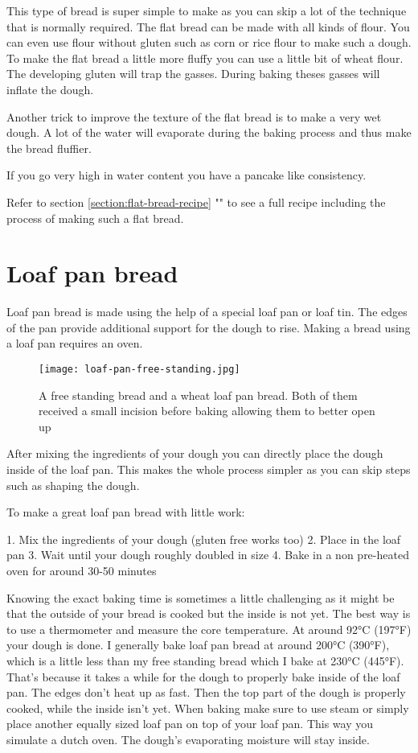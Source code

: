 This type of bread is super simple to make as you can skip
a lot of the technique that is normally required. The flat
bread can be made with all kinds of flour. You can even use
flour without gluten such as corn or rice flour to make such
a dough. To make the flat bread a little more fluffy you
can use a little bit of wheat flour. The developing gluten
will trap the gasses. During baking theses gasses will
inflate the dough.

Another trick to improve the texture of the flat bread is to
make a very wet dough. A lot of the water will evaporate
during the baking process and thus make the bread fluffier.

If you go very high in water content you have a pancake
like consistency.

Refer to section \ref{section:flat-bread-recipe} ""
to see a full recipe including the process of making such a flat bread.

\section{Loaf pan bread}

Loaf pan bread is made using the help of a special loaf pan
or loaf tin. The edges of the pan provide additional support
for the dough to rise. Making a bread using a loaf pan requires
an oven.

\begin{figure}[!htb]
  \texttt{[image: loaf-pan-free-standing.jpg]}
  \caption{A free standing bread and a wheat loaf pan bread. Both of them
  received a small incision before baking allowing them to
  better open up}
  \label{fig:free-standing-loaf-pan}
\end{figure}

After mixing the ingredients of your dough you can directly
place the dough inside of the loaf pan. This makes the whole
process simpler as you can skip steps such as shaping the dough.

To make a great loaf pan bread with little work:

1. Mix the ingredients of your dough (gluten free works too)
2. Place in the loaf pan
3. Wait until your dough roughly doubled in size
4. Bake in a non pre-heated oven for around 30-50 minutes

Knowing the exact baking time is sometimes a little challenging
as it might be that the outside of your bread is cooked but
the inside is not yet. The best way is to use a thermometer
and measure the core temperature. At around 92°C (197°F) your
dough is done. I generally bake loaf pan bread at around 200°C (390°F),
which is a little less than my free standing bread which I bake
at 230°C (445°F). That's because it takes a while for the dough
to properly bake inside of the loaf pan. The edges don't heat up
as fast. Then the top part of the dough is properly cooked, while
the inside isn't yet. When baking make sure to use steam
or simply place another equally sized loaf pan on top
of your loaf pan. This way you simulate a dutch oven. The dough's
evaporating moisture will stay inside.

